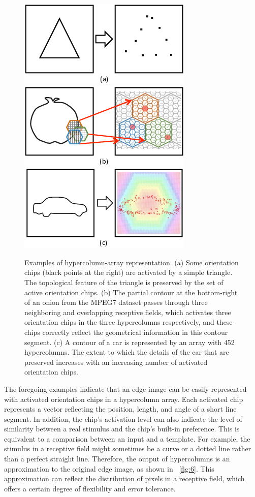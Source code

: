 \documentclass[journal]{IEEEtran}
\begin{document}
\begin{figure}[!t]
\centering
\includegraphics[width=0.25\linewidth]{images/fig3.png}\hfil%
\includegraphics[width=0.25\linewidth]{images/fig4.png}\hfil%
\includegraphics[width=0.25\linewidth]{images/fig5.png}
\caption{Examples of hypercolumn-array representation.
(a) Some orientation chips (black points at the right) are activated by a simple triangle.
The topological feature of the triangle is preserved by the set of active orientation chips.
(b) The partial contour at the bottom-right of an onion from the MPEG7 dataset 
passes through three neighboring and overlapping receptive fields, 
which activates three orientation chips in the three hypercolumns respectively, 
and these chips correctly reflect the geometrical information in this contour segment.
(c) A contour of a car is represented by an array with 452 hypercolumns. 
The extent to which the details of the car that are preserved increases 
with an increasing number of activated orientation chips.}
\label{fig:3to5}
\end{figure}

The foregoing examples indicate that an edge image can be easily represented with activated orientation chips in a hypercolumn array. 
Each activated chip represents a vector reflecting the position, length, and angle of a short line segment. 
In addition, the chip's activation level can also indicate the level of similarity between a real stimulus and the chip's built-in preference. 
This is equivalent to a comparison between an input and a template. 
For example, the stimulus in a receptive field might sometimes be a curve or a dotted line rather than a perfect straight line. 
Therefore, the output of hypercolumns is an approximation to the original edge image, 
as shown in \figurename~\ref{fig:6}. 
This approximation can reflect the distribution of pixels in a receptive field, which offers a certain degree of flexibility and error tolerance.
\end{document}
